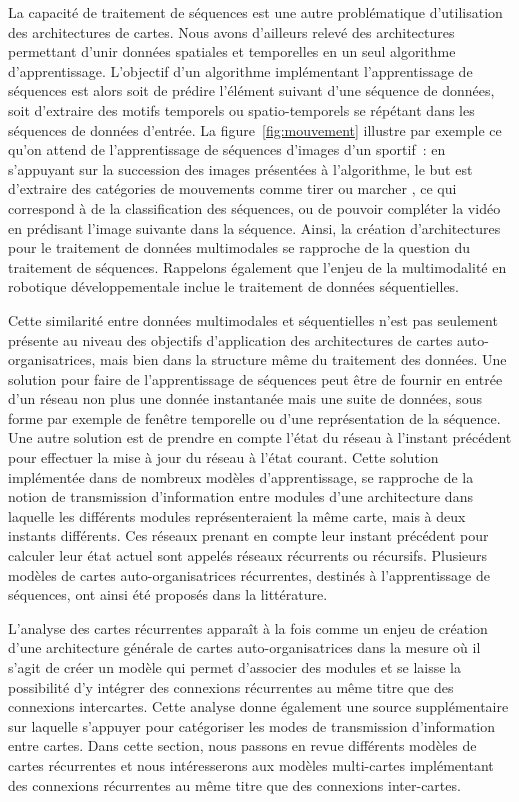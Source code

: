 \documentclass[../main]{subfiles}
\begin{document}
La capacité de traitement de séquences est une autre problématique d'utilisation des architectures de cartes. Nous avons d'ailleurs relevé des architectures permettant d'unir données spatiales et temporelles en un seul algorithme d'apprentissage. L'objectif d'un algorithme implémentant l'apprentissage de séquences est alors soit de prédire l'élément suivant d'une séquence de données, soit d'extraire des motifs temporels ou spatio-temporels se répétant dans les séquences de données d'entrée. 
La figure~\ref{fig:mouvement} illustre par exemple ce qu'on attend de l'apprentissage de séquences d'images d'un sportif~: en s'appuyant sur la succession des images présentées à l'algorithme, le but est d'extraire des catégories de mouvements comme \og tirer \fg{} ou \og marcher \fg{}, ce qui correspond à de la classification des séquences, ou de pouvoir compléter la vidéo en prédisant l'image suivante dans la séquence.
Ainsi, la création d'architectures pour le traitement de données multimodales se rapproche de la question du traitement de séquences. Rappelons également que l'enjeu de la multimodalité en robotique développementale inclue le traitement de données séquentielles.


Cette similarité entre données multimodales et séquentielles n'est pas seulement présente au niveau des objectifs d'application des architectures de cartes auto-organisatrices, mais bien dans la structure même du traitement des données. 
Une solution pour faire de l'apprentissage de séquences peut être de fournir en entrée d'un réseau non plus une donnée instantanée mais une suite de données, sous forme par exemple de fenêtre temporelle ou d'une représentation de la séquence.
Une autre solution est de prendre en compte l'état du réseau à l'instant précédent pour effectuer la mise à jour du réseau à l'état courant. 
Cette solution implémentée dans de nombreux modèles d'apprentissage, se rapproche de la notion de transmission d'information entre modules d'une architecture dans laquelle les différents modules représenteraient la même carte, mais à deux instants différents. Ces réseaux prenant en compte leur instant précédent pour calculer leur état actuel sont appelés réseaux récurrents ou récursifs.
Plusieurs modèles de cartes auto-organisatrices récurrentes, destinés à l'apprentissage de séquences, ont ainsi été proposés dans la littérature.

L'analyse des cartes récurrentes apparaît à la fois comme un enjeu de création d'une architecture générale de cartes auto-organisatrices dans la mesure où il s'agit de créer un modèle qui permet d'associer des modules et se laisse la possibilité d'y intégrer des connexions récurrentes au même titre que des connexions intercartes. Cette analyse donne également une source supplémentaire sur laquelle s'appuyer pour catégoriser les modes de transmission d'information entre cartes. Dans cette section, nous passons en revue différents modèles de cartes récurrentes et nous intéresserons aux modèles multi-cartes implémentant des connexions récurrentes au même titre que des connexions inter-cartes.
\end{document}
